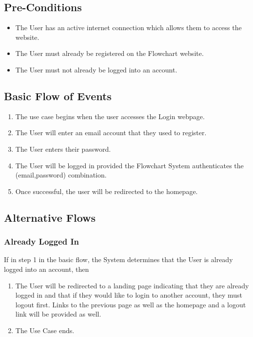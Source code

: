 \documentclass[a4paper,11pt]{article}
\begin{document}
\subsection{Pre-Conditions}
\begin{itemize}
\item The User has an active internet connection which allows them to access the website.
\item The User must already be registered on the Flowchart website.
\item The User must not already be logged into an account.
\end{itemize}

\subsection{Basic Flow of Events}
\begin{enumerate}
\item The use case begins when the user accesses the Login webpage.
\item The User will enter an email account that they used to register.
\item The User enters their password.
\item The User will be logged in provided the Flowchart System authenticates the (email,password) combination.
\item Once successful, the user will be redirected to the homepage.
\end{enumerate}

\subsection{Alternative Flows}
\subsubsection{Already Logged In}
If in step 1 in the basic flow, the System determines that the User is already logged into an account, then
\begin{enumerate}
\item The User will be redirected to a landing page indicating that they are already logged in and that if they would like to login to another account, they must logout first. Links to the previous page as well as the homepage and a logout link will be provided as well.
\item The Use Case ends.
\end{enumerate}
\end{document}
